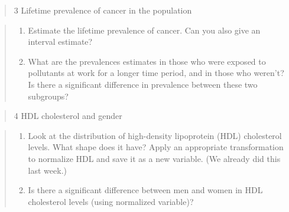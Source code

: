 \documentclass[]{article}
\begin{document}
\begin{quote}
3 Lifetime prevalence of cancer in the population
\end{quote}

\begin{quote}
\begin{enumerate}
\def\labelenumi{\alph{enumi})}
\itemsep1pt\parskip0pt
\item
  Estimate the lifetime prevalence of cancer. Can you also give an
  interval estimate?
\item
  What are the prevalences estimates in those who were exposed to
  pollutants at work for a longer time period, and in those who weren't?
  Is there a significant difference in prevalence between these two
  subgroups?
\end{enumerate}
\end{quote}

\begin{quote}
4 HDL cholesterol and gender
\end{quote}

\begin{quote}
\begin{enumerate}
\def\labelenumi{\alph{enumi})}
\itemsep1pt\parskip0pt
\item
  Look at the distribution of high-density lipoprotein (HDL) cholesterol
  levels. What shape does it have? Apply an appropriate transformation
  to normalize HDL and save it as a new variable. (We already did this
  last week.)
\item
  Is there a significant difference between men and women in HDL
  cholesterol levels (using normalized variable)?
\end{enumerate}
\end{quote}
\end{document}
